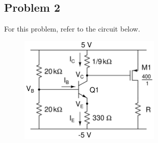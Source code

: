 \documentclass{article}
\begin{document}
\subsection*{Problem 2}
For this problem, refer to the circuit below.
\begin{figure}[!htb]
\begin{center}
    \includegraphics[width=0.6\textwidth]{figures/cc_dc1 (1).png}
\end{center}
\end{figure}
\end{document}
